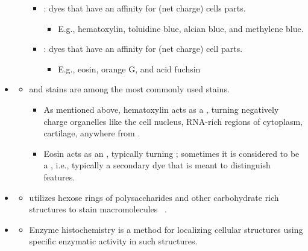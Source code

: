 \begin{itemize}
\begin{itemize}
        \begin{itemize}
          \item {}: dyes that have an affinity for  (net  charge) cells parts.
            \begin{itemize}
              \item E.g., hematoxylin, toluidine blue, alcian blue, and methylene blue.
            \end{itemize}
          \item {}: dyes that have an affinity for  (net  charge) cell parts.
            \begin{itemize}
              \item E.g., eosin, orange G, and acid fuchsin
            \end{itemize}
        \end{itemize}
    \end{itemize}
  \item {}
    \begin{itemize}
      \item {} and  stains are among the most commonly used stains. 
        \begin{itemize}
          \item As mentioned above, hematoxylin acts as a , turning negatively charge organelles like the cell nucleus, RNA-rich regions of cytoplasm, cartilage, anywhere from  \chap{\to} .
          \item Eosin acts as an , typically turning ; sometimes it is considered to be a , i.e., typically a secondary dye that is meant to distinguish features.
        \end{itemize}
    \end{itemize}
  \item {}
    \begin{itemize}
      \item {} utilizes hexose rings of polysaccharides and other carbohydrate rich structures to stain macromolecules  \to~.
    \end{itemize}
  \item {}
    \begin{itemize}
      \item Enzyme histochemistry is a method for localizing cellular structures using specific enzymatic activity in such structures.

\end{itemize}
\end{itemize}
